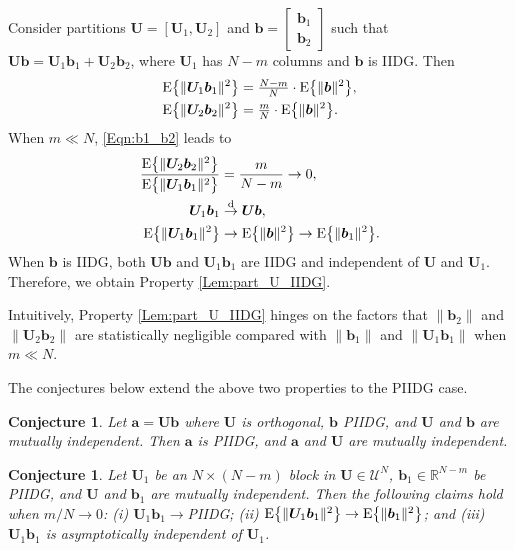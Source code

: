 \documentclass[journal]{IEEEtran}
\newcommand{\BS}{\begin{subequations}}
\newcommand{\ES}{\end{subequations}}
\renewcommand{\bf}{\bm}
\newcommand{\bb}{\mathbb}
\renewcommand{\cal}{\mathcal}
\newtheorem{conjecture}[theorem]{Conjecture}
\begin{document}
\begin{IEEEproof}
Consider partitions $\bf{U}=[\bf{U}_1,\bf{U}_2]$ and $\bf{b}=\left[\begin{array}{cc}
     \bf{b}_1  \\
     \bf{b}_2 
\end{array}\right]$ such that $\bf{Ub}=\bf{U}_1\bf{b}_1+\bf{U}_2\bf{b}_2$, where $\bf{U}_1$ has $N-m$ columns and $\bf{b}$ is IIDG. Then
\BS\label{Eqn:b1_b2}\begin{align}
    {\rm E}\big\{\|\bf{U}_1\bf{b}_1\|^2\big\}&=\tfrac{N-m}{N}\cdot {\rm E}\big\{\|\bf{b}\|^2\big\},\\
    {\rm E}\big\{\|\bf{U}_2\bf{b}_2\|^2\big\}&=\tfrac{m}{N}\cdot {\rm E}\big\{\|\bf{b}\|^2\big\}.
\end{align}\ES
When $m\ll N$, \eqref{Eqn:b1_b2} leads to
\BS\label{Eqn:b1_2_b}\begin{align}
    \frac{{\rm E}\big\{\|\bf{U}_2\bf{b}_2\|^2\big\}}{{\rm E}\big\{\|\bf{U}_1\bf{b}_1\|^2\big\}}&= \frac{m}{N-m}\to 0,\\
    \bf{U}_1\bf{b}_1&\overset{\rm d}{\to}\bf{U}\bf{b},\\
     {\rm E}\big\{\|\bf{U}_1\bf{b}_1\|^2\big\}&\to  {\rm E}\big\{\|\bf{b}\|^2\big\}\to {\rm E}\big\{\|\bf{b}_1\|^2\big\}.
\end{align}\ES
When $\bf{b}$ is IIDG, both $\bf{Ub}$ and $\bf{U}_1\bf{b}_1$ are  IIDG and independent of $\bf{U}$ and $\bf{U}_1$. Therefore, we obtain Property \ref{Lem:part_U_IIDG}.
\end{IEEEproof} 

Intuitively, Property \ref{Lem:part_U_IIDG} hinges on the factors that $\|\bf{b}_2\|$ and $\|\bf{U}_2\bf{b}_2\|$ are statistically negligible compared with $\|\bf{b}_1\|$ and $\|\bf{U}_1\bf{b}_1\|$  when $m\ll N$. 

The conjectures below extend the above two properties to the PIIDG case. 

\begin{conjecture}\label{Conj:VT_Gau}
  Let $\bf{a}=\bf{Ub}$ where $\bf{U}$ is orthogonal, $\bf{b}$ PIIDG, and $\bf{U}$ and $\bf{b}$ are mutually independent. Then $\bf{a}$ is PIIDG, and $\bf{a}$ and $\bf{U}$ are mutually independent.
\end{conjecture}
 

 
\begin{conjecture}\label{Conj:part_U_IIDG}
    Let $\bf{U}_1$ be an $N\times(N-m)$ block in $\bf{U}\in\bf{\cal{U}}^N$, $\bf{b}_1\in\bb{R}^{N-m}$ be PIIDG, and $\bf{U}$ and $\bf{b}_1$ are mutually independent. Then the following claims hold when $m/N\to0$: (i) $\bf{U}_1\bf{b}_1\to$PIIDG; (ii) ${\rm E}\big\{\|\bf{U}_1\bf{b}_1\|^2\big\} \to {\rm E}\big\{\|\bf{b}_1\|^2\big\}$; and (iii) $\bf{U}_1\bf{b}_1$ is asymptotically independent of $\bf{U}_1$. 
\end{conjecture}
\end{document}
